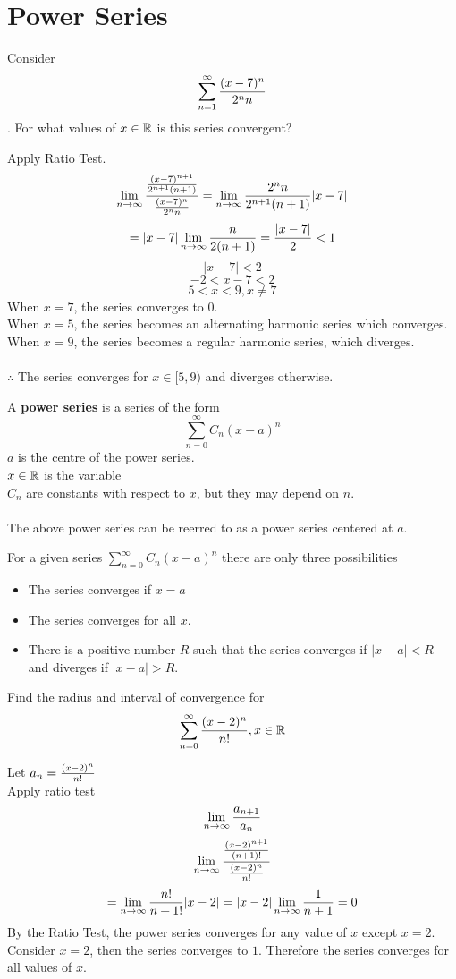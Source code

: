 \documentclass[english, 12pt]{article}
\begin{document}
\section{Power Series}
\begin{exmp}
Consider
\[ \sum_{n=1}^\infty \frac{(x-7)^n}{2^n n} \].
For what values of $x \in {\mathbb{R}}$ is this series convergent?
\begin{sol}
Apply Ratio Test.
\[\lim_{n\to\infty} \frac{\frac{(x-7)^{n+1}}{2^{n+1}(n+1)}}{\frac{(x-7)^n}{2^n n}} = \lim_{n\to\infty} \frac{2^n n}{2^{n+1}(n+1)} |x-7| \]
\[= |x-7| \lim_{n\to\infty} \frac{n}{2(n+1)} = \frac{|x-7|}{2} < 1 \]
\[ |x-7| < 2 \]
\[ -2 < x-7 < 2 \]
\[ 5 < x < 9, x \neq 7 \]
When $x=7$, the series converges to $0$.\\
When $x=5$, the series becomes an alternating harmonic series which converges.\\
When $x=9$, the series becomes a regular harmonic series, which diverges.\\\\
$\therefore$ The series converges for $x \in [5,9)$ and diverges otherwise.
\end{sol}
\end{exmp}
\begin{defn}
A \textbf{power series} is a series of the form 
\[\sum_{n=0}^\infty C_{n} (x-a)^n\]
$a$ is the centre of the power series.\\
$x \in {\mathbb{R}}$ is the variable\\
$C_{n}$ are constants with respect to $x$, but they may depend on $n$.\\\\
The above power series can be reerred to as a power series centered at $a$.
\end{defn}
\begin{thrm}
For a given series $\sum_{n=0}^\infty C_{n} (x-a)^n$ there are only three possibilities
\begin{itemize}
\item The series converges if $x =a$
\item The series converges for all $x$.
\item There is a positive number $R$ such that the series converges if $|x-a|<R$ and diverges if $|x-a| > R$.
\end{itemize}
\end{thrm}
\begin{exmp}
Find the radius and interval of convergence for 
\[\sum_{n=0}^\infty \frac{(x-2)^n}{n!}, x \in {\mathbb{R}}\]
\begin{sol}
Let $a_{n} = \frac{(x-2)^n}{n!}$\\
Apply ratio test
\[ \lim_{n\to\infty} \frac{a_{n+1}}{a_{n}} \]
\[ \lim_{n\to\infty} \frac{\frac{(x-2)^{n+1}}{(n+1)!}}{\frac{(x-2)^n}{n!}}\]
\[ = \lim_{n\to\infty} \frac{n!}{n+1!} |x - 2| = |x-2| \lim_{n\to\infty} \frac{1}{n+1} = 0 \]
By the Ratio Test, the power series converges for any value of $x$ except $x = 2$. Consider $x = 2$, then the series converges to $1$. Therefore the series converges for all values of $x$.
\end{sol}
\end{exmp}
\end{document}
